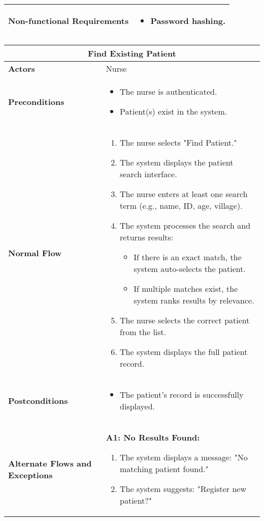 \documentclass{article}
\begin{document}
\begin{longtable}{| p{5cm} | p{10cm} |}
    \hline
    \textbf{Non-functional Requirements} & 
    \begin{itemize}
        \item Password hashing.
    \end{itemize} \\
    \hline
\end{longtable}

\renewcommand{\arraystretch}{1.3} %

\begin{longtable}{| p{5cm} | p{10cm} |}
    \hline
    \multicolumn{2}{|c|}{\textbf{Find Existing Patient}} \\
    \hline
    \textbf{Actors} & Nurse \\
    \hline
    \textbf{Preconditions} & 
    \begin{itemize}
        \item The nurse is authenticated.
        \item Patient(s) exist in the system.
    \end{itemize} \\
    \hline
    \textbf{Normal Flow} & 
    \begin{enumerate}
        \item The nurse selects "Find Patient."
        \item The system displays the patient search interface.
        \item The nurse enters at least one search term (e.g., name, ID, age, village).
        \item The system processes the search and returns results:
        \begin{itemize}
            \item If there is an exact match, the system auto-selects the patient.
            \item If multiple matches exist, the system ranks results by relevance.
        \end{itemize}
        \item The nurse selects the correct patient from the list.
        \item The system displays the full patient record.
    \end{enumerate} \\
    \hline
    \textbf{Postconditions} & 
    \begin{itemize}
        \item The patient's record is successfully displayed.
    \end{itemize} \\
    \hline
    \textbf{Alternate Flows and Exceptions} & 
    \textbf{A1: No Results Found:}  
    \begin{enumerate}
        \item The system displays a message: "No matching patient found."
        \item The system suggests: "Register new patient?"
    \end{enumerate}
    

\end{longtable}
\end{document}
